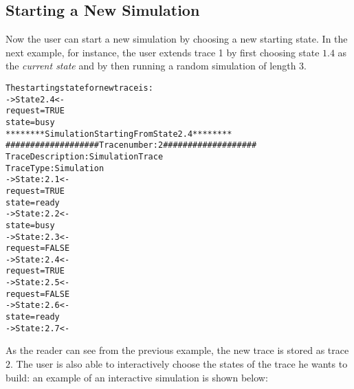 \subsection{Starting a New Simulation}
\label{Starting a New Simulation}
Now the user can start a new simulation by choosing a new starting state.
In the next example, for instance, the user extends trace 1 by first
choosing state $1.4$ as the \emph{current state} and by then running a random simulation
of length $3$.
\begin{alltt}
\nusmvprompt {}
The starting state for new trace is:
-> State 2.4 <-
    request = TRUE
    state = busy
\nusmvprompt {}
********  Simulation Starting From State  2.4  ********
\nusmvprompt {}
################### Trace number: 2 ###################
Trace Description: Simulation Trace
Trace Type: Simulation
-> State: 2.1 <-
    request = TRUE
    state = ready
-> State: 2.2 <-
    state = busy
-> State: 2.3 <-
    request = FALSE
-> State: 2.4 <-
    request = TRUE
-> State: 2.5 <-
    request = FALSE
-> State: 2.6 <-
    state = ready
-> State: 2.7 <-
\nusmvprompt
\end{alltt}
As the reader can see from the previous example, the new trace is
stored as trace $2$.
The user is also able to interactively choose the states of the trace he wants to build:
an example of an interactive simulation is shown below:

